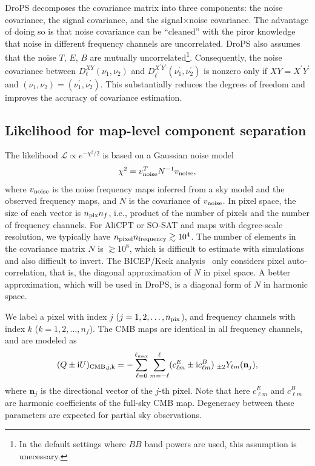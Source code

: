 \documentclass[12pt, a4paper]{ctexart} %
\begin{document}
DroPS decomposes the covariance matrix into three components: the noise covariance, the signal covariance, and the signal$\times$noise covariance. The advantage of doing so is that noise covariance can be ``cleaned'' with the piror knowledge that noise in different frequency channels are uncorrelated. DroPS also assumes that the noise $T$, $E$, $B$ are mutually uncorrelated\footnote{In the default settings where $BB$ band powers are used, this assumption is unecessary.}. Consequently, the noise covariance between $D^{XY}_\ell(\nu_1,\nu_2)$ and $D^{X^\prime Y^\prime}_{\ell^\prime}(\nu_1^\prime,\nu_2^\prime)$ is nonzero only if $XY=X^\prime Y^\prime$ and $(\nu_1, \nu_2) = (\nu_1^\prime, \nu_2^\prime)$. This substantially reduces the degrees of freedom and improves the accuracy of covariance estimation.


\subsection{Likelihood for map-level component separation \label{sec:sgld_like}}

The likelihood $\mathcal{L}\propto e^{-\chi^2/2}$ is based on a Gaussian noise model
\begin{equation}
  \chi^2 = v_{\rm noise}^TN^{-1}v_{\rm noise},
\end{equation}
where $v_{\rm noise}$ is the noise frequency maps inferred from a sky model and the observed frequency maps, and $N$ is the covariance of $v_{\rm noise}$. In pixel space, the size of each vector is $n_{\rm pix} n_f$, i.e., product of the number of pixels and the number of frequency channels. For AliCPT or SO-SAT and maps with degree-scale resolution, we typically have $n_{\rm pixel} n_{\rm frequency} \gtrsim 10^4$. The number of elements in the covariance matrix $N$ is $\gtrsim 10^8$, which is difficult to estimate with simulations and also difficult to invert. The BICEP/Keck analysis~\cite{BKmap} only considers pixel auto-correlation, that is, the diagonal approximation of $N$ in pixel space. A better approximation, which will be used in DroPS, is a diagonal form of $N$ in harmonic space.

We label a pixel with index $j$ ($j=1, 2, \ldots, n_{\rm pix}$), and frequency channels with index $k$ ($k = 1, 2, \ldots, n_f$). The CMB maps are identical in all frequency channels, and are modeled as
\begin{equation}
  (Q\pm \mathrm{i}U)_{\rm CMB, j, k} = -\sum_{\ell = 0}^{\ell_{\max}}\sum_{m=-\ell}^\ell (c_{\ell m}^E\pm \mathrm{i} c_{\ell m}^B)\;_{\pm 2}Y_{\ell m}(\mathbf{n}_j), \label{eq:CMB_comp}
\end{equation}
where $\mathbf{n}_j$ is the directional vector of the $j$-th pixel. Note that here $c_{\ell m}^E$ and $c_{\ell m}^B$ are harmonic coefficients of the full-sky CMB map. Degeneracy between these parameters are expected for partial sky observations. 
\end{document}
